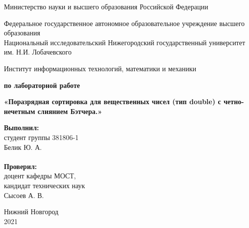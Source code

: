 \documentclass{report}
\begin{document}
\begin{titlepage}

\begin{center}
Министерство науки и высшего образования Российской Федерации
\end{center}

\begin{center}
Федеральное государственное автономное образовательное учреждение высшего образования \\
Национальный исследовательский Нижегородский государственный университет им. Н.И. Лобачевского
\end{center}

\begin{center}
Институт информационных технологий, математики и механики
\end{center}

\vspace{4em}

\begin{center}
\textbf{ по лабораторной работе} \\
\end{center}
\begin{center}
\textbf{\Large«Поразрядная сортировка для вещественных чисел (тип double) с четно-нечетным слиянием Бэтчера.»} \\
\end{center}

\vspace{4em}

\newbox{\lbox}
\newlength{\maxl}
\setlength{\maxl}{\wd\lbox}
\hfill\parbox{7cm}{
\hspace*{5cm}\hspace*{-5cm}\textbf{Выполнил:} \\ студент группы 381806-1 \\ Белик Ю. А.\\
\\
\hspace*{5cm}\hspace*{-5cm}\textbf{Проверил:}\\ доцент кафедры МОСТ, \\ кандидат технических наук \\ Сысоев А. В.\\
}
\vspace{\fill}

\begin{center} Нижний Новгород \\ 2021 \end{center}

\end{titlepage}
\end{document}
